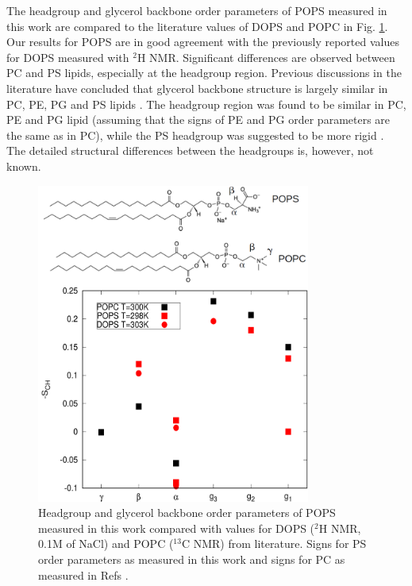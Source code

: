 \documentclass[aps,prl,superscriptaddress,twocolumn]{revtex4}
\begin{document}
The headgroup and glycerol backbone order parameters of 
POPS measured in this work are compared to the literature values of
DOPS \cite{browning80} and POPC \cite{ferreira13} in Fig. \ref{HGorderParameters}. 
Our results for POPS are in good agreement with the previously reported
values for DOPS measured with $^2$H NMR. Significant differences are
observed between PC and PS lipids, especially at the headgroup region.  
Previous discussions in the literature have concluded that  
glycerol backbone structure is largely similar in
PC, PE, PG and PS lipids \cite{gally81}. The headgroup region was
found to be similar in PC, PE and PG lipid (assuming that the signs of PE and PG
order parameters are the same as in PC), while the PS headgroup was suggested
to be more rigid \cite{wohlgemuth80,buldt81}. 
The detailed structural differences between the headgroups is, however, not known.
\begin{figure}[]
  \centering
  \includegraphics[width=9.0cm]{../Figs/PCPScomp.pdf}
  \caption{\label{HGorderParameters}
    Headgroup and glycerol backbone order parameters of POPS measured in this work compared
    with values for DOPS ($^2$H NMR, 0.1M of NaCl) \cite{browning80} and 
    POPC  ($^{13}$C NMR) \cite{ferreira13} from literature. Signs for PS order parameters
    as measured in this work and signs for PC as measured in Refs \cite{??,ferreira16}.
  }
\end{figure}
\end{document}

